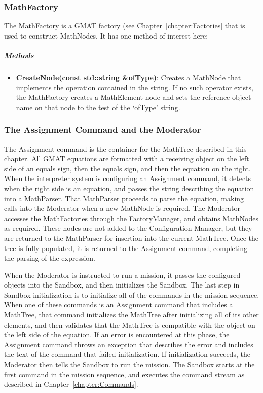 \subsubsection{MathFactory}

The MathFactory is a GMAT factory (see Chapter~\ref{chapter:Factories} that is used to construct
MathNodes.  It has one method of interest here:

\subparagraph{\textit{Methods}}
\begin{itemize}
\item \textbf{CreateNode(const std::string \&ofType)}: Creates a MathNode that implements the
operation contained in the string.  If no such operator exists, the MathFactory creates a
MathElement node and sets the reference object name on that node to the test of the `ofType' string.
\end{itemize}

\subsubsection{The Assignment Command and the Moderator}

The Assignment command is the container for the MathTree described in this chapter.  All GMAT
equations are formatted with a receiving object on the left side of an equals sign, then the equals
sign, and then the equation on the right.  When the interpreter system is configuring an Assignment
command, it detects when the right side is an equation, and passes the string describing the
equation into a MathParser.  That MathParser proceeds to parse the equation, making calls into the
Moderator when a new MathNode is required.  The Moderator accesses the MathFactories through the
FactoryManager, and obtains MathNodes as required.  These nodes are not added to the Configuration
Manager, but they are returned to the MathParser for insertion into the current MathTree.  Once the
tree is fully populated, it is returned to the Assignment command, completing the parsing of the
expression.

When the Moderator is instructed to run a mission, it passes the configured objects into the
Sandbox, and then initializes the Sandbox.  The last step in Sandbox initialization is to initialize
all of the commands in the mission sequence.  When one of these commands is an Assignment command
that includes a MathTree, that command initializes the MathTree after initializing all of its other
elements, and then validates that the MathTree is compatible with the object on the left side of the
equation.  If an error is encountered at this phase, the Assignment command throws an exception that
describes the error and includes the text of the command that failed initialization.  If
initialization succeeds, the Moderator then tells the Sandbox to run the mission.  The Sandbox
starts at the first command in the mission sequence, and executes the command stream as described in
Chapter~\ref{chapter:Commands}.


